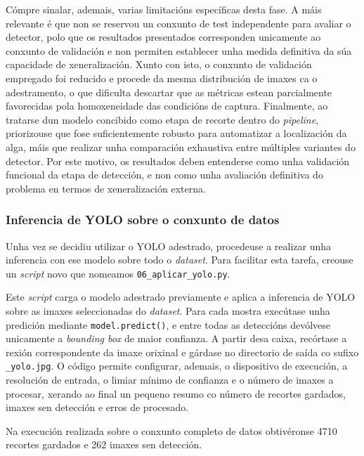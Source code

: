 Cómpre sinalar, ademais, varias limitacións específicas desta fase. A máis relevante é que non se
reservou un conxunto de test independente para avaliar o detector, polo que os resultados
presentados corresponden unicamente ao conxunto de validación e non permiten establecer unha medida
definitiva da súa capacidade de xeneralización. Xunto con isto, o conxunto de validación empregado
foi reducido e procede da mesma distribución de imaxes ca o adestramento, o que dificulta descartar
que as métricas estean parcialmente favorecidas pola homoxeneidade das condicións de captura.
Finalmente, ao tratarse dun modelo concibido como etapa de recorte dentro do \textit{pipeline},
priorizouse que fose suficientemente robusto para automatizar a localización da alga, máis que
realizar unha comparación exhaustiva entre múltiples variantes do detector. Por este motivo, os
resultados deben entenderse como unha validación funcional da etapa de detección, e non como unha
avaliación definitiva do problema en termos de xeneralización externa.

\subsubsection{Inferencia de YOLO sobre o conxunto de datos}
Unha vez se decidiu utilizar o YOLO adestrado, procedeuse a realizar unha inferencia con ese modelo sobre todo o \textit{dataset}.
Para facilitar esta tarefa, creouse un \textit{script} novo que nomeamos \texttt{06\_aplicar\_yolo.py}.

Este \textit{script} carga o modelo adestrado previamente e aplica a inferencia de YOLO sobre as
imaxes seleccionadas do \textit{dataset}. Para cada mostra execútase unha predición mediante
\texttt{model.predict()}, e entre todas as deteccións devólvese unicamente a \textit{bounding box}
de maior confianza. A partir desa caixa, recórtase a rexión correspondente da imaxe orixinal e
gárdase no directorio de saída co sufixo \texttt{\_yolo.jpg}. O código permite configurar, ademais,
o dispositivo de execución, a resolución de entrada, o limiar mínimo de confianza e o número de
imaxes a procesar, xerando ao final un pequeno resumo co número de recortes gardados, imaxes sen
detección e erros de procesado.

Na execución realizada sobre o conxunto completo de datos obtivéronse 4710 recortes gardados e 262
imaxes sen detección.

